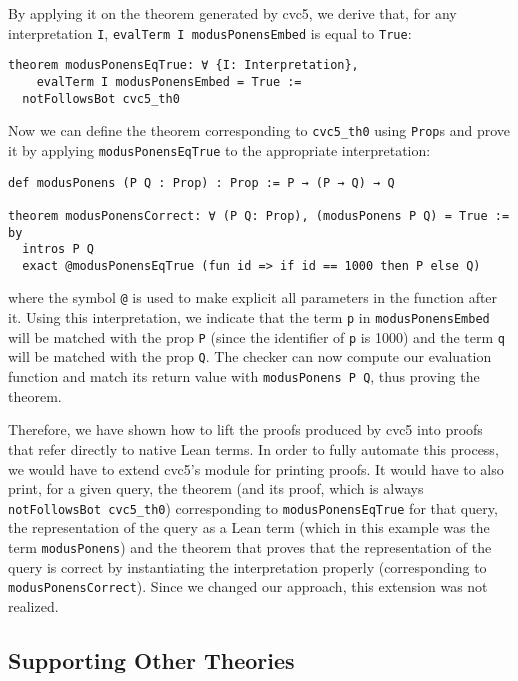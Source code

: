 By applying it on the theorem generated by cvc5, we derive that, for any
interpretation \texttt{I}, \texttt{evalTerm I modusPonensEmbed} is equal
to \texttt{True}:

\begin{verbatim}
theorem modusPonensEqTrue: ∀ {I: Interpretation},
    evalTerm I modusPonensEmbed = True :=
  notFollowsBot cvc5_th0
\end{verbatim}

Now we can define the theorem corresponding to \texttt{cvc5\_th0} using
\texttt{Prop}s and prove it by applying \texttt{modusPonensEqTrue} to
the appropriate interpretation:

\begin{verbatim}
def modusPonens (P Q : Prop) : Prop := P → (P → Q) → Q

theorem modusPonensCorrect: ∀ (P Q: Prop), (modusPonens P Q) = True := by
  intros P Q
  exact @modusPonensEqTrue (fun id => if id == 1000 then P else Q)
\end{verbatim}

where the symbol \texttt{@} is used to make explicit all parameters
in the function after it. Using this interpretation, we indicate
that the term \texttt{p} in \texttt{modusPonensEmbed}
will be matched with the prop \texttt{P} (since the identifier of \texttt{p}
is 1000) and the term \texttt{q} will be matched with the prop \texttt{Q}.
The checker can now compute our evaluation function and
match its return value with \texttt{modusPonens P Q}, thus proving the theorem.

Therefore, we have shown how to lift the proofs produced by cvc5 into proofs
that refer directly to native Lean terms. In order to fully automate this
process, we would have to extend cvc5's module for printing proofs. It would
have to also print, for a given query, the theorem (and its proof, which is always
\texttt{notFollowsBot cvc5\_th0}) corresponding to \texttt{modusPonensEqTrue} for that query,
the representation of the query as a Lean term (which in this example was the term \texttt{modusPonens})
and the theorem that proves that the representation of the query is correct by instantiating the interpretation
properly (corresponding to \texttt{modusPonensCorrect}).
Since we changed our approach, this extension was not realized.

\subsection{Supporting Other Theories}

